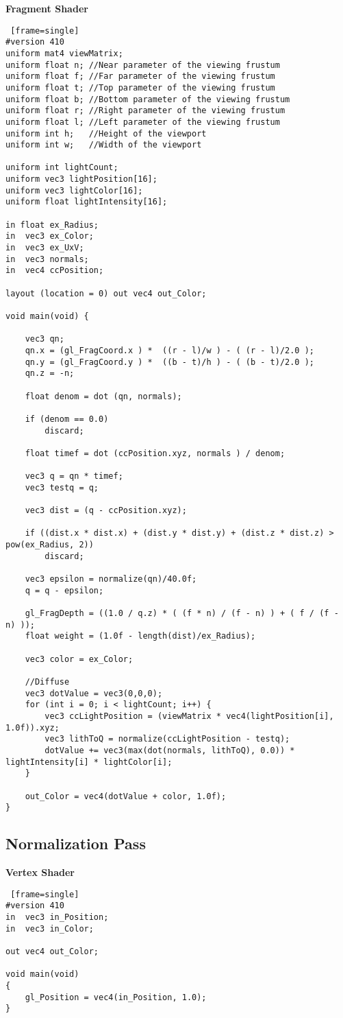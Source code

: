 \textbf{Fragment Shader}
\begin{lstlisting} [frame=single]
#version 410
uniform mat4 viewMatrix;
uniform float n; //Near parameter of the viewing frustum
uniform float f; //Far parameter of the viewing frustum
uniform float t; //Top parameter of the viewing frustum
uniform float b; //Bottom parameter of the viewing frustum
uniform float r; //Right parameter of the viewing frustum
uniform float l; //Left parameter of the viewing frustum
uniform int h; 	 //Height of the viewport
uniform int w; 	 //Width of the viewport

uniform int lightCount;
uniform vec3 lightPosition[16];
uniform vec3 lightColor[16];
uniform float lightIntensity[16];

in float ex_Radius;
in  vec3 ex_Color;
in 	vec3 ex_UxV;
in  vec3 normals;
in 	vec4 ccPosition;

layout (location = 0) out vec4 out_Color;

void main(void) {

	vec3 qn;
	qn.x = (gl_FragCoord.x ) *  ((r - l)/w ) - ( (r - l)/2.0 );
	qn.y = (gl_FragCoord.y ) *  ((b - t)/h ) - ( (b - t)/2.0 );
	qn.z = -n;

	float denom = dot (qn, normals);

	if (denom == 0.0)
		discard;

	float timef = dot (ccPosition.xyz, normals ) / denom;

	vec3 q = qn * timef;
	vec3 testq = q;

	vec3 dist = (q - ccPosition.xyz);

	if ((dist.x * dist.x) + (dist.y * dist.y) + (dist.z * dist.z) > pow(ex_Radius, 2))
		discard;

	vec3 epsilon = normalize(qn)/40.0f;
	q = q - epsilon;

	gl_FragDepth = ((1.0 / q.z) * ( (f * n) / (f - n) ) + ( f / (f - n) ));
	float weight = (1.0f - length(dist)/ex_Radius);

	vec3 color = ex_Color;

	//Diffuse
	vec3 dotValue = vec3(0,0,0);
	for (int i = 0; i < lightCount; i++) {
		vec3 ccLightPosition = (viewMatrix * vec4(lightPosition[i], 1.0f)).xyz;
		vec3 lithToQ = normalize(ccLightPosition - testq);
		dotValue += vec3(max(dot(normals, lithToQ), 0.0)) * lightIntensity[i] * lightColor[i];
	}

	out_Color = vec4(dotValue + color, 1.0f);
}
\end{lstlisting}
\newpage

\subsection{Normalization Pass}
\textbf{Vertex Shader}
\begin{lstlisting} [frame=single]
#version 410
in  vec3 in_Position;
in 	vec3 in_Color;

out vec4 out_Color;

void main(void)
{
	gl_Position = vec4(in_Position, 1.0);
}
\end{lstlisting}

